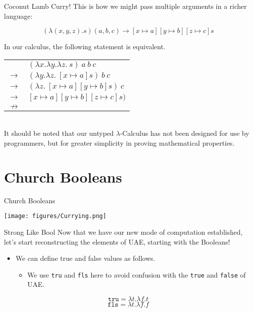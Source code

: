 \documentclass[11pt]{beamer}
\begin{document}
\begin{frame}[fragile=singleslide]{Coconut Lamb Curry!}
This is how we might pass multiple arguments in a richer language:

\begin{equation}
(\lambda(x,y,z). s) (a,b,c) \rightarrow [x \mapsto a][y \mapsto b][z \mapsto c]s
\end{equation}

In our calculus, the following statement is equivalent. \\
\vspace{1em}
\begin{center}
\begin{tabular}{c l}
& $(\lambda x.\lambda y.\lambda z.\:s)\:a\:b\:c$ \\ 
$\rightarrow$ & $(\lambda y.\lambda z.\:[x \mapsto a]s)\:b\:c$ \\
$\rightarrow$ & $(\lambda z.\:[x \mapsto a][y \mapsto b]s)\:c$ \\
$\rightarrow$ & $[x \mapsto a][y \mapsto b][z \mapsto c]s)$ \\
$\nrightarrow$ & \\
\end{tabular} \\
It should be noted that our untyped $\lambda$-Calculus has not been designed for use by programmers, but for greater simplicity in proving mathematical properties.  
\end{center}

\end{frame}


\section[Booleans]{Church Booleans}
\begin{frame}[fragile=singleslide]{Church Booleans}
\begin{center}
\texttt{[image: figures/Currying.png]}
\end{center}
\end{frame}

\begin{frame}[fragile=singleslide]{Strong Like Bool}
Now that we have our new mode of computation established, let's start reconstructing the elements of UAE, starting with the Booleans!
\begin{itemize}
\item We can define true and false values as follows.
\begin{itemize}
\item We use \texttt{tru} and \texttt{fls} here to avoid confusion with the \texttt{true} and \texttt{false} of UAE.
\end{itemize}
\end{itemize}
\begin{equation}
\texttt{tru} = \lambda t. \lambda f. t
\end{equation}
\begin{equation}
\texttt{fls} = \lambda t. \lambda f. f
\end{equation}
\end{frame}
\end{document}
